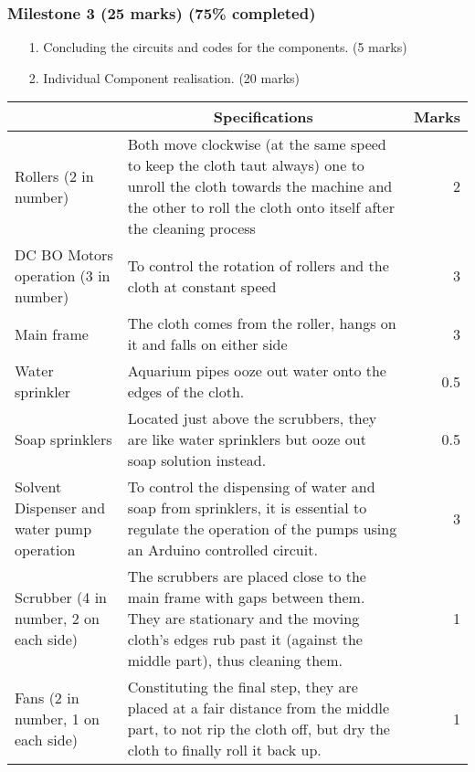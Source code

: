 \documentclass[table,french,english]{rapportCS}
\begin{document}
\subsubsection{Milestone 3 (25 marks) (75\% completed)}
\begin{enumerate}

    \item[1.] Concluding the circuits and codes for the components. (5 marks)
    \item[2.] Individual Component realisation. (20 marks)
\end{enumerate}
\begin{longtable}{|>{\raggedright}p{3cm}|p{10cm}|r|}

\hline
    \multicolumn{1}{|c|}{\textbf{Components}} & \multicolumn{1}{|c|}{\textbf{Specifications}} & \multicolumn{1}{|c|}{\textbf{Marks}} \\
\hline
Rollers (2 in number) & Both move clockwise (at the same speed to keep the cloth taut always) one to unroll the cloth towards the machine and the other to roll the cloth onto itself after the cleaning process & 2 \\
\hline
DC BO Motors operation (3 in number) & To control the rotation of rollers and the cloth at constant speed & 3 \\
\hline
Main frame & The cloth comes from the roller, hangs on it and falls on either side &	3 \\
\hline
Water sprinkler & Aquarium pipes ooze out water onto the edges of the cloth. & 0.5\\
\hline
Soap sprinklers	& Located just above the scrubbers, they are like water sprinklers but ooze out soap solution instead. & 0.5 \\
\hline
Solvent Dispenser and water pump operation & To control the dispensing of water and soap from sprinklers, it is essential to regulate the operation of the pumps using an Arduino controlled circuit.	& 3 \\
\hline
Scrubber (4 in number, 2 on each side)	& The scrubbers are placed close to the main frame with gaps between them. They are stationary and the moving cloth’s edges rub past it (against the middle part), thus cleaning them. & 1 \\
\hline
Fans (2 in number, 1 on each side) & Constituting the final step, they are placed at a fair distance from the middle part, to not rip the cloth off, but dry the cloth to finally roll it back up. & 1\\

\end{longtable}
\end{document}
